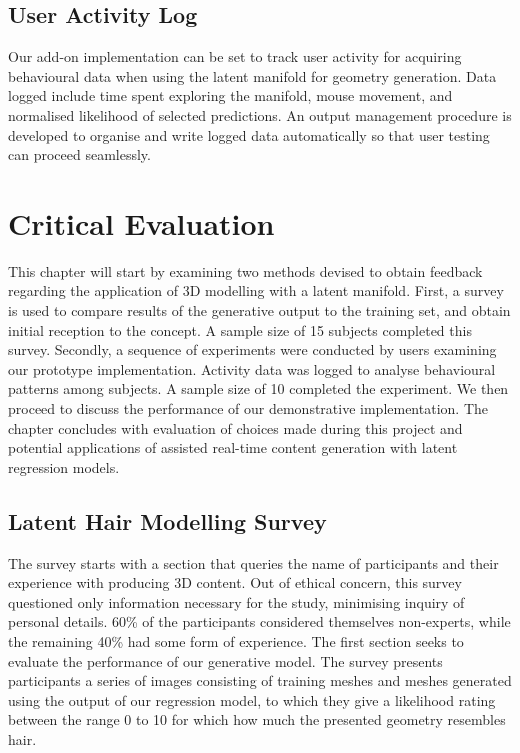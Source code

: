\documentclass[ %
author={Dillon Keith Diep},
supervisor={Dr. Carl Henrik Ek},
degree={MEng},
title={ART-CG:},
subtitle={Assisted Real-time Content Generation of 3D Hair by Learning Manifolds},
type={Research},
year={2017} ]{dissertation}
\begin{document}
\section{User Activity Log}
Our add-on implementation can be set to track user activity for acquiring behavioural data when using the latent manifold for geometry generation. Data logged include time spent exploring the manifold, mouse movement, and normalised likelihood of selected predictions. An output management procedure is developed to organise and write logged data automatically so that user testing can proceed seamlessly.


\chapter{Critical Evaluation}
\label{chap:evaluation}
This chapter will start by examining two methods devised to obtain feedback regarding the application of 3D modelling with a latent manifold. First, a survey is used to compare results of the generative output to the training set, and obtain initial reception to the concept. A sample size of 15 subjects completed this survey. Secondly, a sequence of experiments were conducted by users examining our prototype implementation. Activity data was logged to analyse behavioural patterns among subjects. A sample size of 10 completed the experiment. We then proceed to discuss the performance of our demonstrative implementation. The chapter concludes with evaluation of choices made during this project and potential applications of assisted real-time content generation with latent regression models.

\section{Latent Hair Modelling Survey}
The survey starts with a section that queries the name of participants and their experience with producing 3D content. Out of ethical concern, this survey questioned only information necessary for the study, minimising inquiry of personal details. 60\% of the participants considered themselves non-experts, while the remaining 40\% had some form of experience. The first section seeks to evaluate the performance of our generative model. The survey presents participants a series of images consisting of training meshes and meshes generated using the output of our regression model, to which they give a likelihood rating between the range 0 to 10 for which how much the presented geometry resembles hair. 
\end{document}
